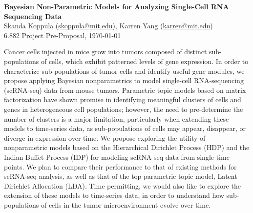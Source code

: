 \documentclass[11pt]{article}
\begin{document}
\begin{centering}
\Large
    \textbf{Bayesian Non-Parametric Models for Analyzing Single-Cell RNA Sequencing Data}  \\
    \vspace{2mm}
    \normalsize
    Skanda Koppula (\url{skoppula@mit.edu}), Karren Yang (\url{karren@mit.edu}) \\
    \vspace{2mm}
    \normalsize
    6.882 Project Pre-Proposal, \today \\
\end{centering}
\vspace{5mm}

Cancer cells injected in mice grow into tumors composed of distinct sub-populations of cells, which exhibit patterned levels of gene expression. In order to characterize sub-populations of tumor cells and identify useful gene modules, we propose applying Bayesian nonparametrics to model single-cell RNA-sequencing (scRNA-seq) data from mouse tumors. Parametric topic models based on matrix factorization have shown promise in identifying meaningful clusters of cells and genes in heterogeneous cell populations; however, the need to pre-determine the number of clusters is a major limitation, particularly when extending these models to time-series data, as sub-populations of cells may appear, disappear, or diverge in expression over time. We propose exploring the utility of nonparametric models based on the Hierarchical Dirichlet Process (HDP) and the Indian Buffet Process (IDP) for modeling scRNA-seq data from single time points. We plan to compare their performance to that of existing methods for scRNA-seq analysis, as well as that of the top parametric topic model, Latent Dirichlet Allocation (LDA). Time permitting, we would also like to explore the extension of these models to time-series data, in order to understand how sub-populations of cells in the tumor microenvironment evolve over time.
\end{document}

